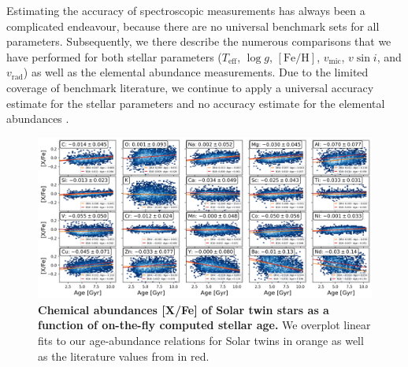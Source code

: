 \documentclass[
  journal=pasa,
  manuscript=research-paper, %
  year=2023,
  volume=37
]{cup-journal}
\newcommand{\SB}[1]{{\textcolor{purple}{#1}}}
\newcommand{\Teff}{$T_\mathrm{eff}$\xspace}
\newcommand{\logg}{$\log g$\xspace}
\newcommand{\feh}{$\mathrm{[Fe/H]}$\xspace}
\newcommand{\vmic}{$v_\mathrm{mic}$\xspace}
\newcommand{\vsini}{$v \sin i$\xspace}
\newcommand{\vrad}{$v_\mathrm{rad}$\xspace}
\begin{document}
Estimating the accuracy of spectroscopic measurements has always been a complicated endeavour, because there are no universal benchmark sets for all parameters. Subsequently, we there describe the numerous comparisons that we have performed for both stellar parameters (\Teff, \logg, \feh, \vmic, \vsini, and \vrad) as well as the elemental abundance measurements. Due to the limited coverage of benchmark literature, we continue to apply a universal accuracy estimate for the stellar parameters and no accuracy estimate for the elemental abundances \citep[as for GALAH DR3][]{Buder2021}.


\begin{figure}[ht]
 \centering
 \includegraphics[width=\textwidth]{figures/galah_dr4_age_xfe_trends_solar_twins_allstar.png}
 \caption{\textbf{Chemical abundances [X/Fe] of Solar twin stars as a function of on-the-fly computed stellar age.} We overplot linear fits to our age-abundance relations for Solar twins in orange as well as the literature values from \citet{Bedell2018} in red.}
 \label{fig:galah_dr4_age_xfe_trends_solar_twins_allstar}
\end{figure}
\end{document}
